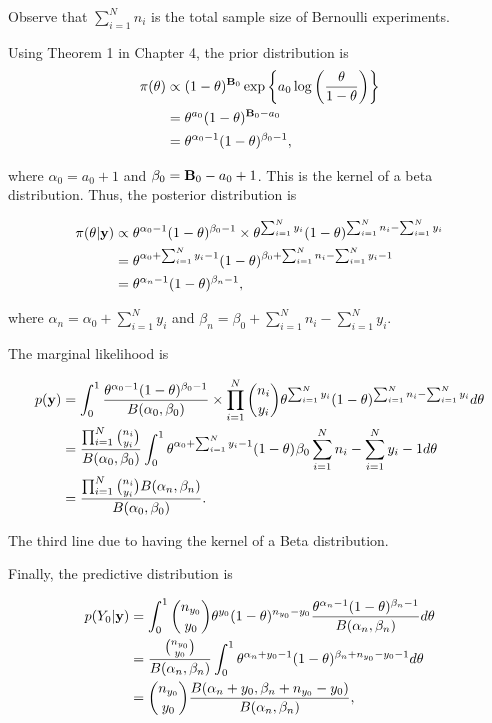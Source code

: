 \begin{enumerate}[leftmargin=*]
Observe that $\sum_{i=1}^N n_i$ is the total sample size of Bernoulli experiments. 

Using Theorem 1 in Chapter 4, the prior distribution is \begin{align*}\pi(\theta)&\propto(1-\theta)^{{\bf{B}}_0}\exp\left\{a_0\log\left(\frac{\theta}{1-\theta}\right)\right\}\\
	&=\theta^{a_0}(1-\theta)^{{\bf{B}}_0-a_0}\\
	&=\theta^{\alpha_0-1}(1-\theta)^{\beta_0-1},
\end{align*}

where $\alpha_0=a_0+1$ and $\beta_0={\bf{B}}_0-a_0+1$. This is the kernel of a beta distribution. Thus, the posterior distribution is

\begin{align*}
	\pi(\theta|{\bf{y}})&\propto \theta^{\alpha_0-1}(1-\theta)^{\beta_0-1} \times \theta^{\sum_{i=1}^Ny_i}(1-\theta)^{\sum_{i=1}^N n_i-\sum_{i=1}^N y_i}\\
	&=\theta^{\alpha_0+\sum_{i=1}^Ny_i - 1}(1-\theta)^{\beta_0 + \sum_{i=1}^N n_i-\sum_{i=1}^N y_i - 1}\\
	&=\theta^{\alpha_n-1}(1-\theta)^{\beta_n-1},  
\end{align*}

where $\alpha_n = \alpha_0+\sum_{i=1}^Ny_i$ and $\beta_n=\beta_0 + \sum_{i=1}^N n_i-\sum_{i=1}^N y_i$.

The marginal likelihood is

\begin{align*}
	p({\bf{y}})&=\int_0^1 \frac{\theta^{\alpha_0-1}(1-\theta)^{\beta_0-1}}{B(\alpha_0,\beta_0)}\times \prod_{i=1}^N{n_i \choose y_i}\theta^{\sum_{i=1}^Ny_i}(1-\theta)^{\sum_{i=1}^N n_i-\sum_{i=1}^N y_i} d\theta\\
	&=\frac{ \prod_{i=1}^N{n_i \choose y_i}}{B(\alpha_0,\beta_0)}\int_0^1 \theta^{\alpha_0+\sum_{i=1}^Ny_i-1}(1-\theta)^{}\beta_0\sum_{i=1}^N n_i-\sum_{i=1}^N y_i-1 d\theta\\
	&=\frac{ \prod_{i=1}^N{n_i \choose y_i}B(\alpha_n,\beta_n)}{B(\alpha_0,\beta_0)}. 
\end{align*}

The third line due to having the kernel of a Beta distribution.

Finally, the predictive distribution is

\begin{align*}
	p(Y_0|{\bf{y}})&=\int_0^1 {n_{y_0} \choose y_0} \theta^{y_0}(1-\theta)^{n_{y_0}-y_0}\frac{\theta^{\alpha_n-1}(1-\theta)^{\beta_n-1}}{B(\alpha_n,\beta_n)}d\theta\\
	&=\frac{{n_{y_0} \choose y_0}}{B(\alpha_n,\beta_n)}\int_0^1  \theta^{\alpha_n+y_0-1}(1-\theta)^{\beta_n+n_{y_0}-y_0-1}d\theta\\
	&={n_{y_0} \choose y_0}\frac{B(\alpha_n+y_0,\beta_n+n_{y_0}-y_0)}{B(\alpha_n,\beta_n)},
\end{align*}


\end{enumerate}
